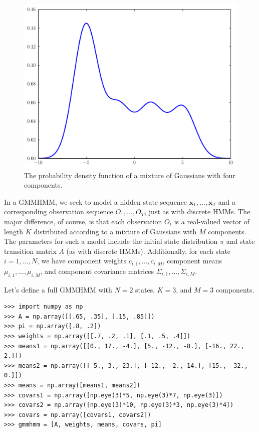 \begin{figure}
\centering
\includegraphics[width=\textwidth]{mixture}
\caption{The probability density function of a mixture of Gaussians with four components.}
\label{fig:mixture}
\end{figure}


In a GMMHMM, we seek to model a hidden state sequence $\mathbf{x}_1,\ldots,\mathbf{x}_T$ and a corresponding observation sequence $O_1,\ldots,O_T$, just as with discrete HMMs.
The major difference, of course, is that each observation $O_t$ is a real-valued vector of length $K$ distributed according to a mixture of Gaussians with $M$ components.
The parameters for such a model include the initial state distribution $\pi$ and state transition matrix $A$ (as with discrete HMMs).
Additionally, for each state $i=1,\ldots,N$, we have component weights $c_{i,1},\ldots,c_{i,M}$, component means $\mu_{i,1},\ldots,\mu_{i,M}$, and component covariance matrices
$\Sigma_{i,1},\ldots,\Sigma_{i,M}$.

Let's define a full GMMHMM with $N=2$ states, $K = 3$, and $M=3$ components.
\begin{lstlisting}
>>> import numpy as np
>>> A = np.array([[.65, .35], [.15, .85]])
>>> pi = np.array([.8, .2])
>>> weights = np.array([[.7, .2, .1], [.1, .5, .4]])
>>> means1 = np.array([[0., 17., -4.], [5., -12., -8.], [-16., 22., 2.]])
>>> means2 = np.array([[-5., 3., 23.], [-12., -2., 14.], [15., -32., 0.]])
>>> means = np.array([means1, means2])
>>> covars1 = np.array([np.eye(3)*5, np.eye(3)*7, np.eye(3)])
>>> covars2 = np.array([np.eye(3)*10, np.eye(3)*3, np.eye(3)*4])
>>> covars = np.array([covars1, covars2])
>>> gmmhmm = [A, weights, means, covars, pi]
\end{lstlisting}

